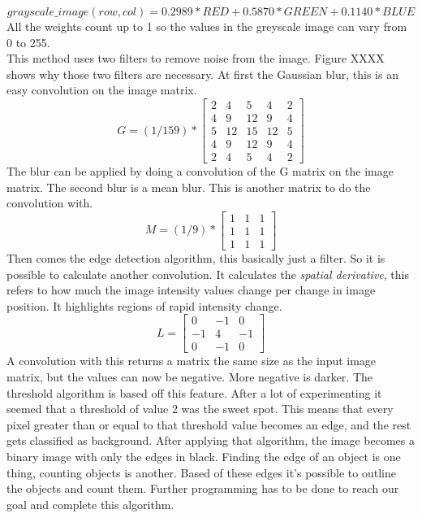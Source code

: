 \documentclass[11pt]{article}
\begin{document}
\begin{equation}
grayscale\_image(row, col) = 0.2989 * RED + 0.5870 * GREEN + 0.1140 * BLUE
\end{equation}
All the weights count up to 1 so the values in the greyscale image can vary from 0 to 255.
\\This method uses two filters to remove noise from the image. Figure XXXX shows why those two filters are necessary.
At first the Gaussian blur, this is an easy convolution on the image matrix.
\begin{equation}
  G = (1/159) * 
  \begin{bmatrix}
   2 & 4 & 5 & 4 & 2\\
   4 & 9 & 12 & 9 & 4\\
   5 & 12 & 15 & 12 & 5\\
   4 & 9 & 12 & 9& 4\\
   2 & 4 & 5 & 4 & 2
  \end{bmatrix}
\end{equation}
The blur can be applied by doing a convolution of the G matrix on the image matrix.
The second blur is a mean blur. This is another matrix to do the convolution with.
\begin{equation}
M = (1/9) * 
\begin{bmatrix}
	1&1&1\\
	1&1&1\\
	1&1&1
\end{bmatrix}
\end{equation}
Then comes the edge detection algorithm, this basically just a filter. So it is possible to calculate another convolution. It calculates the \textit{spatial  derivative}, this refers to how much the image intensity values change per change in image position. It highlights regions of rapid intensity change.
\begin{equation}
L =\begin{bmatrix}
	0&-1&0\\
	-1&4&-1\\
	0&-1&0
\end{bmatrix}
\end{equation}
A convolution with this returns a matrix the same size as the input image matrix, but the values can now be negative. More negative is darker. The threshold algorithm is based off this feature. After a lot of experimenting it seemed that a threshold of value 2 was the sweet spot. This means that every pixel greater than or equal to that threshold value becomes an edge, and the rest gets classified as background. After applying that algorithm, the image becomes a binary image with only the edges in black. Finding the edge of an object is one thing, counting objects is another. Based of these edges it's possible to outline the objects and count them. Further programming has to be done to reach our goal and complete this algorithm.
\end{document}
